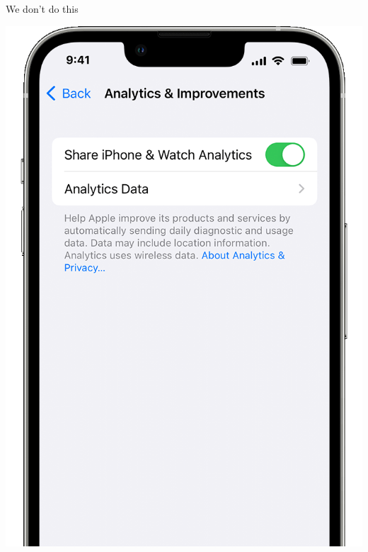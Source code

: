 \documentclass[aspectratio=169]{beamer}
\begin{document}
\begin{frame}{We don't do this}
\vspace{1 cm}
\begin{center}
\includegraphics[width=0.5\linewidth]{PLOTS/iphone-send-usage-data.png}
\end{center}
\end{frame}
\end{document}
